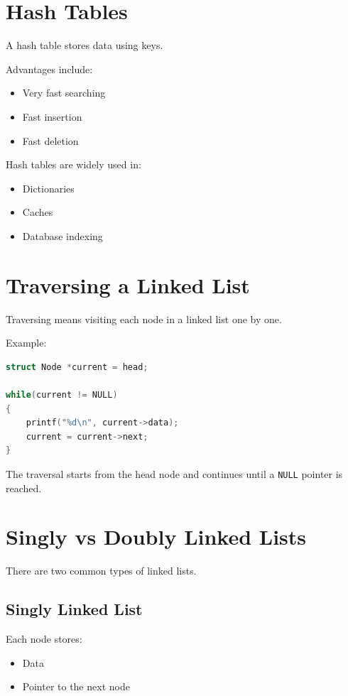 \documentclass[12pt,openany]{book}
\begin{document}
\section{Hash Tables}

A hash table stores data using keys.

Advantages include:

\begin{itemize}
    \item Very fast searching
    \item Fast insertion
    \item Fast deletion
\end{itemize}

Hash tables are widely used in:

\begin{itemize}
    \item Dictionaries
    \item Caches
    \item Database indexing
\end{itemize}
\section{Traversing a Linked List}

Traversing means visiting each node in a linked list one by one.

Example:

\begin{lstlisting}[language=C]
struct Node *current = head;

while(current != NULL)
{
    printf("%d\n", current->data);
    current = current->next;
}
\end{lstlisting}

The traversal starts from the head node and continues until a \texttt{NULL} pointer is reached.

\section{Singly vs Doubly Linked Lists}

There are two common types of linked lists.

\subsection*{Singly Linked List}

Each node stores:

\begin{itemize}
    \item Data
    \item Pointer to the next node
\end{itemize}
\end{document}
